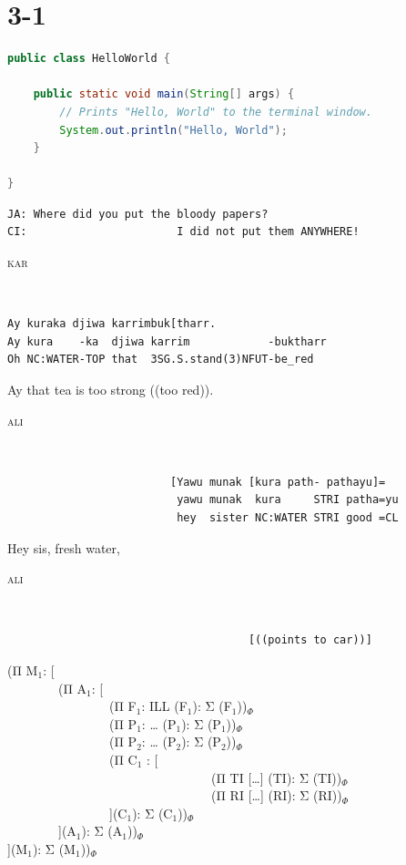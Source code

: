 \documentclass{scrartcl}
\newlength{\transindent}
\newenvironment{transbox}[3][\footnotesize]{%
\setstretch{0.7}
\medskip\noindent
\hspace*{\transindent}%
#1
\parbox[b]{3mm}{#1  \oldstylenums{#2}\vphantom{fj}}%
\parbox[b]{8mm}{#1\scshape  \MakeLowercase{#3} \vphantom{fj}}%
\begin{minipage}[t]{11cm}#1\vspace*{-1.9\baselineskip}{}\,\vphantom{fj}}
{\end{minipage}}
\begin{document}
\section{3-1}
\ea
\begin{lstlisting}[language=java]
 public class HelloWorld {

    public static void main(String[] args) {
        // Prints "Hello, World" to the terminal window.
        System.out.println("Hello, World");
    }

}
\end{lstlisting}
\z

\ea
\begin{lstlisting}
JA: Where did you put the bloody papers? 
CI:                       I did not put them ANYWHERE!
\end{lstlisting}
\z

\ea 
\begin{transbox}{1}{Kar}
\begin{verbatim}
Ay kuraka djiwa karrimbuk[tharr.
Ay kura    -ka  djiwa karrim            -buktharr
Oh NC:WATER-TOP that  3SG.S.stand(3)NFUT-be_red
\end{verbatim}\vspace*{-3mm}
Ay that tea is too strong ((too red)).
\end{transbox}

\begin{transbox}{2}{Ali}
\begin{verbatim}
                         [Yawu munak [kura path- pathayu]=
                          yawu munak  kura     STRI patha=yu
                          hey  sister NC:WATER STRI good =CL
\end{verbatim}\vspace*{-3mm}
Hey sis, fresh water,
\end{transbox}

\begin{transbox}{3}{Ali}
\begin{verbatim}
                                     [((points to car))]
\end{verbatim}\vspace*{-3mm}
\end{transbox}
\z

\ea
(Π M$_1$: [\\
~~~~~~~~(Π A$_1$: [\\
~~~~~~~~~~~~~~~~(Π F$_1$: ILL (F$_1$): Σ (F$_1$))$_\Phi$\\
~~~~~~~~~~~~~~~~(Π P$_1$: {\dots} (P$_1$): Σ (P$_1$))$_\Phi$\\
~~~~~~~~~~~~~~~~(Π P$_2$: {\dots} (P$_2$): Σ (P$_2$))$_\Phi$\\
~~~~~~~~~~~~~~~~(Π C$_1$ : [\\
~~~~~~~~~~~~~~~~~~~~~~~~~~~~~~~~(Π TI [{\dots}] (TI): Σ (TI))$_\Phi$\\
~~~~~~~~~~~~~~~~~~~~~~~~~~~~~~~~(Π RI [{\dots}] (RI): Σ (RI))$_\Phi$\\
~~~~~~~~~~~~~~~~](C$_1$): Σ (C$_1$))$_\Phi$\\
~~~~~~~~](A$_1$): Σ (A$_1$))$_\Phi$\\
](M$_1$): Σ (M$_1$))$_\Phi$ \\
\z
\end{document}
